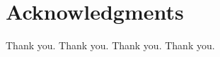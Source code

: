 
%
%

%
%

\section*{Acknowledgments}
\label{sec:acknowledgments}

Thank you.
Thank you.
Thank you.
Thank you.

